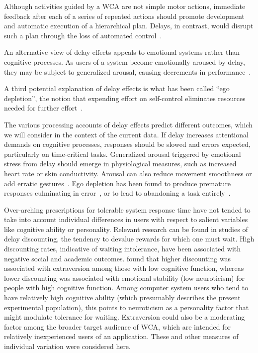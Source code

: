 \documentclass[10pt,letterpaper]{article}
\begin{document}
Although activities guided by a WCA are not simple motor actions, immediate feedback after each of a series of repeated actions should promote development and automatic execution of a hierarchical plan.
Delays, in contrast, would disrupt such a plan through the loss of automated control~\autocite{lee2019limiting}.

An alternative view of delay effects appeals to emotional systems rather than cognitive processes.
As users of a system become emotionally aroused by delay, they may be subject to generalized arousal, causing decrements in performance~\autocite{lee2019limiting}.

A third potential explanation of delay effects is what has been called ``ego depletion'', the notion that expending effort on self-control eliminates resources needed for further effort~\autocite{baumeister74tice,lin2020strong}.

The various processing accounts of delay effects predict different outcomes, which we will consider in the context of the current data.
If delay increases attentional demands on cognitive processes, responses should be slowed and errors expected, particularly on time-critical tasks.
Generalized arousal triggered by emotional stress from delay should emerge in physiological measures, such as increased heart rate or skin conductivity.
Arousal can also reduce movement smoothness or add erratic gestures~\autocite{pijpers2003anxiety}.
Ego depletion has been found to produce premature responses culminating in error~\autocite{lin2020strong}, or to lead to abandoning a task entirely~\autocite{baumeister74tice}. 

Over-arching prescriptions for tolerable system response time have not tended to take into account individual differences in users with respect to salient variables like cognitive ability or personality. 
Relevant research can be found in studies of delay discounting, the tendency to devalue rewards for which one must wait.
High discounting rates, indicative of waiting intolerance, have been associated with negative social and academic outcomes.
\textcite{hirsh2008delay} found that higher discounting was associated with extraversion among those with low cognitive function, whereas lower discounting was associated with emotional stability (low neuroticism) for people with high cognitive function.
Among computer system users who tend to have relatively high cognitive ability (which presumably describes the present experimental population), this points to neuroticism as a personality factor that might modulate tolerance for waiting. Extraversion could also  be  a moderating factor among the broader target audience of WCA, which are intended for relatively inexperienced users of an application.
These and other measures of individual variation were considered here.
\end{document}
